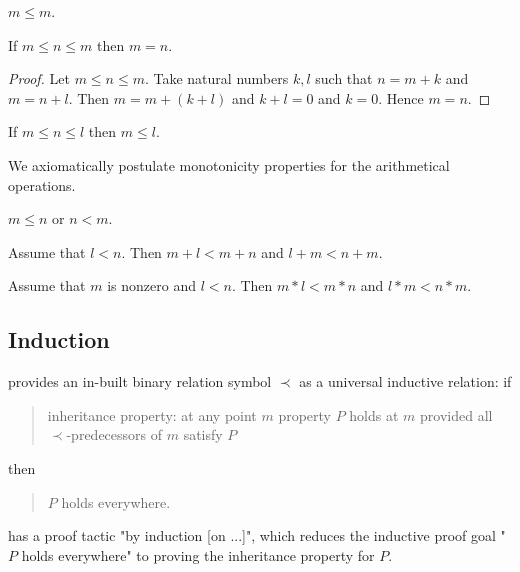\documentclass[english,11pt]{article}
\begin{document}
\begin{forthel}

\begin{lemma}
$m \leq m$.
\end{lemma}

\begin{lemma}
If $m \leq n \leq m$ then $m = n$.
\end{lemma}
\begin{proof}
Let $m \leq n \leq m$.
Take natural numbers $k,l$ such that
$n = m + k$ and $m = n + l$.
Then $m = m + (k + l)$ and $k + l = 0$ and $k = 0$.
Hence $m = n$.
\end{proof}

\begin{lemma}
If $m \leq n \leq l$ then  $m \leq l$.
\end{lemma}
\end{forthel}
We axiomatically postulate monotonicity properties for the arithmetical operations.
\begin{forthel}
\begin{axiom}
$m \leq n$ or $n < m$.
\end{axiom}

\begin{lemma}
Assume that $l < n$.
Then $m + l < m + n$ and $l + m < n + m$.
\end{lemma}

\begin{lemma}
Assume that $m$ is nonzero and $l < n$.
Then $m * l < m * n$ and $l * m < n * m$.
\end{lemma}
\end{forthel}


\subsection{Induction}

\Naproche{} provides an in-built binary relation
symbol $\prec$ as a universal inductive relation: if 

\begin{quote}
inheritance property: at any
point $m$ property $P$ holds at $m$ provided all
$\prec$-predecessors of $m$ satisfy $P$ 
\end{quote} 
then 
\begin{quote}
$P$ holds everywhere.
\end{quote}

\Naproche{} has a proof tactic "by induction [on ...]", which 
reduces the inductive proof goal "$P$ holds everywhere" 
to proving the inheritance property for $P$.
\end{document}
